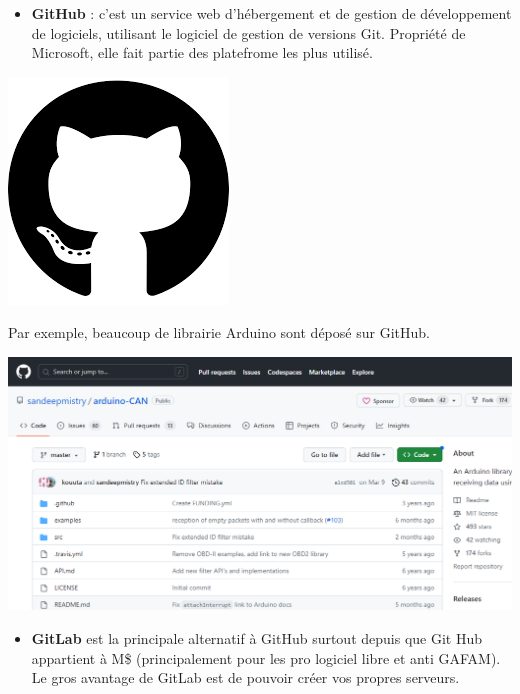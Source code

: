 \documentclass[french, 12pt]{article}%
\newcommand{\itemE}{\item[$\bullet$]}
\begin{document}
\begin{itemize}
\itemE \textbf{GitHub} : c'est un service web d'hébergement et de gestion de développement de logiciels, utilisant le logiciel de gestion de versions Git. Propriété de Microsoft, elle fait partie des platefrome les plus utilisé.
\end{itemize}

\begin{center}
\includegraphics[scale=0.1]{./ressource/gitLogo}
\end{center}

 Par exemple, beaucoup de librairie Arduino sont déposé sur GitHub. 
\begin{center}
\includegraphics[scale=0.4]{./ressource/interfaceGitHub}
\end{center}


\begin{itemize}
\itemE \textbf{GitLab} est la principale alternatif à GitHub surtout depuis que Git Hub appartient à M\$ (principalement pour les pro logiciel libre et anti GAFAM). Le gros avantage de GitLab est de pouvoir créer vos propres serveurs.
\end{itemize}
\end{document}

